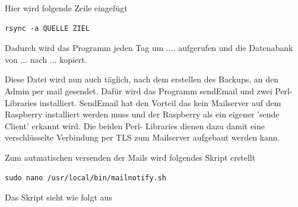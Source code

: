 \documentclass[11pt,a4paper]{article} %
\begin{document}
Hier wird folgende Zeile eingef\"ugt
\begin{frame}

\begin{lstlisting}
rsync -a QUELLE ZIEL 
\end{lstlisting}
\end{frame}
Dadurch wird das Programm jeden Tag um .... aufgerufen und die Datenabank von ... nach ... kopiert.
\par
Diese Datei wird nun auch t\"aglich, nach dem erstellen des Backups, an den Admin per mail gesendet.
Daf\"ur wird das Programm sendEmail und zwei Perl- Libraries installiert. SendEmail hat den Vorteil das kein Mailserver auf dem Raspberry installiert werden muss und der Raspberry als ein eigener 'sende Client' erkannt wird. Die beiden Perl- Libraries dienen dazu damit eine verschl\"usselte Verbindung per TLS zum Mailserver aufgebaut werden kann.
\par
Zum autmatischen versenden der Mails wird folgendes Skript erstellt
\begin{frame}

\begin{lstlisting}
sudo nano /usr/local/bin/mailnotify.sh
\end{lstlisting}
\end{frame}
Das Skript sieht wie folgt aus
\end{document}
